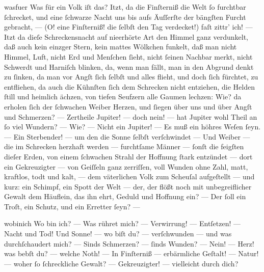 \documentclass{ees}
\begin{document}
{  \begin{movement}{wasfuer}
    Was für ein Volk iſt das? Itzt, da die Finſterniß
    die Welt ſo furchtbar ſchrecket,
    und eine ſchwarze Nacht
    uns bis aufs Äuſſerſte der bängſten Furcht gebracht, —
    (O! eine Finſterniß! die ſelbſt den Tag verdecket!)
    faſt zittr’ ich! — Itzt da dieſe Schreckensnacht
    auf nieerhörte Art den Himmel ganz verdunkelt,
    daß auch kein einzger Stern, kein mattes Wölkchen funkelt,
    daß man nicht Himmel, Luft, nicht Erd und Menſchen ſieht,
    nicht ſeinen Nachbar merkt, nicht Schwerdt und Harniſch blinken,
    da, wenn man fällt, man in den Abgrund denkt zu ſinken,
    da man vor Angſt ſich ſelbſt und alles flieht,
    und doch ſich fürchtet, zu entfliehen,
    da auch die Kühnſten ſich dem Schrecken nicht entziehen,
    die Helden ſtill und heimlich ächzen,
    von tiefen Seufzern alle Gaumen lechzen:
    Wie? da erholen ſich der ſchwachen Weiber Herzen,
    und ſiegen über uns und über Angſt und Schmerzen? —
    Zertheile Jupiter! — doch nein! —
    hat Jupiter wohl Theil an ſo viel Wundern? —
    Wie? — Nicht ein Jupiter! — Es muß ein höhres Weſen ſeyn. —
    Ein Sterbender! — um den die Sonne ſelbſt verſchwindet —
    Und Weiber — die im Schrecken herzhaft werden —
    furchtſame Männer — ſonſt die feigſten dieſer Erden,
    von einem ſchwachen Strahl der Hoffnung ſtark entzündet —
    dort ein Gekreuzigter — von Geiſſeln ganz zerriſſen,
    voll Wunden ohne Zahl, matt, kraftlos, todt und kalt, —
    dem väterlichen Volk zum Scheuſal aufgeſtellt —
    und kurz: ein Schimpf, ein Spott der Welt —
    der, der flößt noch mit unbegreiflicher Gewalt
    dem Häuflein, das ihn ehrt, Geduld und Hoffnung ein? —
    Der ſoll ein Troſt, ein Schutz, und ein Erretter ſeyn? —
  \end{movement}

  \begin{movement}{wobinich}
    Wo bin ich? — Was rühret mich? —
    Verwirrung! — Entſetzen! — Nacht und Tod!
    Und Sonne! — wo biſt du? — verſchwunden —
    und was durchſchaudert mich? —
    Sinds Schmerzen? — ſinds Wunden? —
    Nein! — Herz! was bebſt du? — welche Noth! —
    In Finſterniß — erbärmliche Geſtalt! —
    Natur! — woher ſo ſchreckliche Gewalt? —
    Gekreuzigter! — vielleicht durch dich?
  \end{movement}




}

\eesScore
\end{document}
